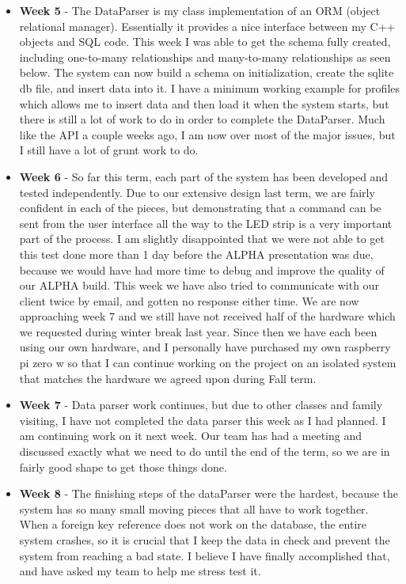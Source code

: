 \documentclass[onecolumn, draftclsnofoot,10pt, compsoc]{IEEEtran}
\begin{document}
\begin{itemize}
					\item \textbf{Week 5} - The DataParser is my class implementation of an ORM (object relational manager). Essentially it provides a nice interface between my C++ objects and SQL code. This week I was able to get the schema fully created, including one-to-many relationships and many-to-many relationships as seen below. The system can now build a schema on initialization, create the sqlite db file, and insert data into it. I have a minimum working example for profiles which allows me to insert data and then load it when the system starts, but there is still a lot of work to do in order to complete the DataParser. Much like the API a couple weeks ago, I am now over most of the major issues, but I still have a lot of grunt work to do. 
					\item \textbf{Week 6} - So far this term, each part of the system has been developed and tested independently. Due to our extensive design last term, we are fairly confident in each of the pieces, but demonstrating that a command can be sent from the user interface all the way to the LED strip is a very important part of the process. I am slightly disappointed that we were not able to get this test done more than 1 day before the ALPHA presentation was due, because we would have had more time to debug and improve the quality of our ALPHA build. This week we have also tried to communicate with our client twice by email, and gotten no response either time. We are now approaching week 7 and we still have not received half of the hardware which we requested during winter break last year. Since then we have each been using our own hardware, and I personally have purchased my own raspberry pi zero w so that I can continue working on the project on an isolated system that matches the hardware we agreed upon during Fall term.  
					\item \textbf{Week 7} - Data parser work continues, but due to other classes and family visiting, I have not completed the data parser this week as I had planned. I am continuing work on it next week. Our team has had a meeting and discussed exactly what we need to do until the end of the term, so we are in fairly good shape to get those things done. 
					\item \textbf{Week 8} - The finishing steps of the dataParser were the hardest, because the system has so many small moving pieces that all have to work together. When a foreign key reference does not work on the database, the entire system crashes, so it is crucial that I keep the data in check and prevent the system from reaching a bad state. I believe I have finally accomplished that, and have asked my team to help me stress test it. 

\end{itemize}
\end{document}
